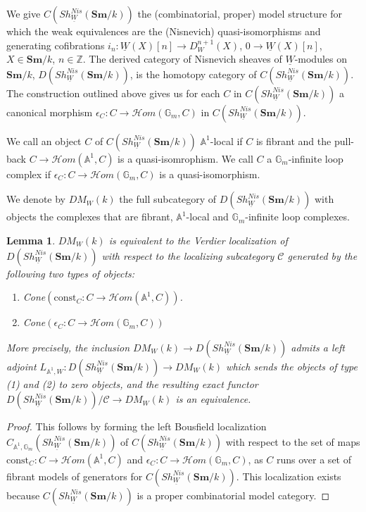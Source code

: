 \documentclass[a4paper,12pt,draft]{amsart}
\newtheorem{lemma}{Lemma}
\theoremstyle{definition}
\theoremstyle{remark}
\begin{document}
We give  $C(Sh^{Nis}_{\underline{W}}({{\mathbf{Sm}}}/k))$ the (combinatorial, proper) model structure for which the weak equivalences are the (Nisnevich) quasi-isomorphisms and generating cofibrations   $i_n:\underline{W}(X)[n]\to D^{n+1}_W(X)$, $0\to \underline{W}(X)[n]$, $X\in {{\mathbf{Sm}}}/k$, $n\in {{\mathbb Z}}$. The derived category  of Nisnevich sheaves of $\underline{W}$-modules on ${{\mathbf{Sm}}}/k$, $D(Sh^{Nis}_{\underline{W}}({{\mathbf{Sm}}}/k))$, is the homotopy category of $C(Sh^{Nis}_{\underline{W}}({{\mathbf{Sm}}}/k))$. The construction outlined above gives us for each $C$ in $C(Sh^{Nis}_{\underline{W}}({{\mathbf{Sm}}}/k))$  a canonical morphism $\epsilon_C:C\to {{\mathcal{H}{om}}}({{\mathbb G}}_m, C)$ in $C(Sh^{Nis}_{\underline{W}}({{\mathbf{Sm}}}/k))$.

We call an object $C$ of $C(Sh^{Nis}_{\underline{W}}({{\mathbf{Sm}}}/k))$ ${{\mathbb A}}^1$-local if $C$ is fibrant and the pull-back $C\to{{\mathcal{H}{om}}}({{\mathbb A}}^1, C)$  is a quasi-isomrophism. We call $C$ a ${{\mathbb G}}_m$-infinite loop complex if $\epsilon_C:C\to {{\mathcal{H}{om}}}({{\mathbb G}}_m, C)$ is a quasi-isomorphism. 

We denote by $DM_W(k)$ the full subcategory of $D(Sh^{Nis}_{\underline{W}}({{\mathbf{Sm}}}/k))$ with objects the complexes that are fibrant,  ${{\mathbb A}}^1$-local and ${{\mathbb G}}_m$-infinite loop complexes. 
 
 \begin{lemma} $DM_W(k)$ is equivalent to the Verdier localization of $D(Sh^{Nis}_{\underline{W}}({{\mathbf{Sm}}}/k))$ with respect to the localizing subcategory ${{\mathcal C}}$ generated by the following two types of objects:
 \begin{enumerate}
 \item Cone$(\text{const}_C:C\to {{\mathcal{H}{om}}}({{\mathbb A}}^1, C))$.
 \item Cone$(\epsilon_C:C\to {{\mathcal{H}{om}}}({{\mathbb G}}_m, C))$
 \end{enumerate}
 More precisely, the inclusion $DM_W(k)\to D(Sh^{Nis}_{\underline{W}}({{\mathbf{Sm}}}/k))$  admits a left adjoint $L_{{{\mathbb A}}^1, W}:
 D(Sh^{Nis}_{\underline{W}}({{\mathbf{Sm}}}/k))\to DM_W(k)$ which sends the objects of type (1) and (2) to zero objects, and the resulting exact functor $D(Sh^{Nis}_{\underline{W}}({{\mathbf{Sm}}}/k))/{{\mathcal C}}\to DM_W(k)$ is an equivalence.
 \end{lemma}
 
 \begin{proof} This follows by forming the left Bousfield localization $C_{{{\mathbb A}}^1,{{\mathbb G}}_m}(Sh^{Nis}_{\underline{W}}({{\mathbf{Sm}}}/k))$ of $C(Sh^{Nis}_{\underline{W}}({{\mathbf{Sm}}}/k))$ with respect to the set of maps $\text{const}_C:C\to {{\mathcal{H}{om}}}({{\mathbb A}}^1, C)$ and $\epsilon_C:C\to {{\mathcal{H}{om}}}({{\mathbb G}}_m, C)$, as $C$ runs over a set of fibrant models of generators for $C(Sh^{Nis}_{\underline{W}}({{\mathbf{Sm}}}/k))$. This localization exists because $C(Sh^{Nis}_{\underline{W}}({{\mathbf{Sm}}}/k))$  is a proper combinatorial model category.
 \end{proof}
 
\end{document}
